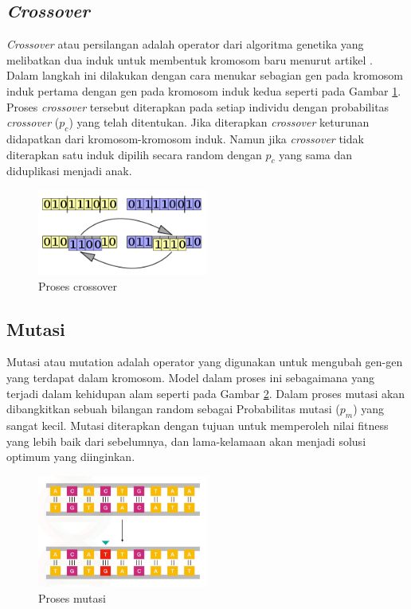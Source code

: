 \subsection{\textit{Crossover}}
\textit{Crossover} atau persilangan adalah operator dari algoritma genetika yang melibatkan dua induk untuk membentuk kromosom baru menurut artikel \cite{hardi2014analisis}. Dalam langkah ini dilakukan dengan cara menukar sebagian gen pada kromosom induk pertama dengan gen pada kromosom induk kedua seperti pada Gambar \ref{fig:crossover}. Proses \textit{crossover} tersebut diterapkan pada setiap individu dengan probabilitas \textit{crossover} ($p_c$) yang telah ditentukan. Jika diterapkan \textit{crossover} keturunan didapatkan dari kromosom-kromosom induk. Namun jika \textit{crossover} tidak diterapkan satu induk dipilih secara random dengan $p_c$ yang sama dan diduplikasi menjadi anak.

\begin{figure}[H]
  \centering
  \includegraphics[width=0.5\textwidth]{Gambar/crossover.png}
  \caption{Proses crossover}
  \label{fig:crossover}
\end{figure}

\subsection{Mutasi}
Mutasi atau mutation adalah operator yang digunakan untuk mengubah gen-gen yang terdapat dalam kromosom. Model dalam proses ini sebagaimana yang terjadi dalam kehidupan alam \cite{rovie2014genetic} seperti pada Gambar \ref{fig:mutasi}. Dalam proses mutasi akan dibangkitkan sebuah bilangan random sebagai Probabilitas mutasi ($p_m$) yang sangat kecil. Mutasi diterapkan dengan tujuan untuk memperoleh nilai fitness yang lebih baik dari sebelumnya, dan lama-kelamaan akan menjadi solusi optimum yang diinginkan.

\begin{figure}[H]
  \centering
  \includegraphics[width=0.5\textwidth]{Gambar/mutasi.jpg}
  \caption{Proses mutasi}
  \label{fig:mutasi}
\end{figure}